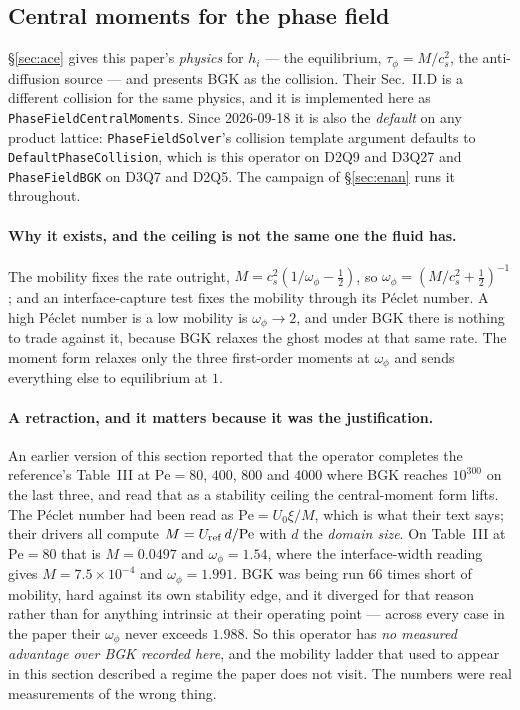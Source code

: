 \documentclass[11pt,a4paper]{article}
\newcommand{\code}[1]{\texttt{\small #1}}
\newcommand{\cs}{c_s}
\newcommand{\e}[1]{\times 10^{#1}}
\begin{document}
\subsection{Central moments for the phase field}\label{sec:acecm}

\S\ref{sec:ace} gives this paper's \emph{physics} for $h_i$ --- the equilibrium,
$\tau_\phi = M/\cs^2$, the anti-diffusion source --- and presents BGK as the
collision. Their Sec.~II.D is a different collision for the same physics, and it
is implemented here as \code{PhaseFieldCentralMoments}. Since 2026-09-18 it is
also the \emph{default} on any product lattice: \code{PhaseFieldSolver}'s
collision template argument defaults to \code{DefaultPhaseCollision}, which is
this operator on D2Q9 and D3Q27 and \code{PhaseFieldBGK} on D3Q7 and D2Q5. The
campaign of \S\ref{sec:enan} runs it throughout.

\paragraph{Why it exists, and the ceiling is not the same one the fluid has.} The
mobility fixes the rate outright,
$M = \cs^2(1/\omega_\phi - \tfrac12)$, so $\omega_\phi = (M/\cs^2 + \tfrac12)^{-1}$;
and an interface-capture test fixes the mobility through its P\'eclet number. A
high P\'eclet number is a low mobility is $\omega_\phi\to2$, and under BGK there
is nothing to trade against it, because BGK relaxes the ghost modes at that same
rate. The moment form relaxes only the three first-order moments at $\omega_\phi$
and sends everything else to equilibrium at $1$.

\paragraph{A retraction, and it matters because it was the justification.} An
earlier version of this section reported that the operator completes the
reference's Table~III at $\mathrm{Pe} = 80$, $400$, $800$ and $4000$ where BGK
reaches $10^{300}$ on the last three, and read that as a stability ceiling the
central-moment form lifts. The P\'eclet number had been read as
$\mathrm{Pe} = U_0\xi/M$, which is what their text says; their drivers all compute
$M = U_{\rm ref}\,d/\mathrm{Pe}$ with $d$ the \emph{domain size}. On Table~III at
$\mathrm{Pe}=80$ that is $M = 0.0497$ and $\omega_\phi = 1.54$, where the
interface-width reading gives $M = 7.5\e{-4}$ and $\omega_\phi = 1.991$. BGK was
being run $66$ times short of mobility, hard against its own stability edge, and
it diverged for that reason rather than for anything intrinsic at their operating
point --- across every case in the paper their $\omega_\phi$ never exceeds
$1.988$. So this operator has \emph{no measured advantage over BGK recorded here},
and the mobility ladder that used to appear in this section described a regime the
paper does not visit. The numbers were real measurements of the wrong thing.
\end{document}
